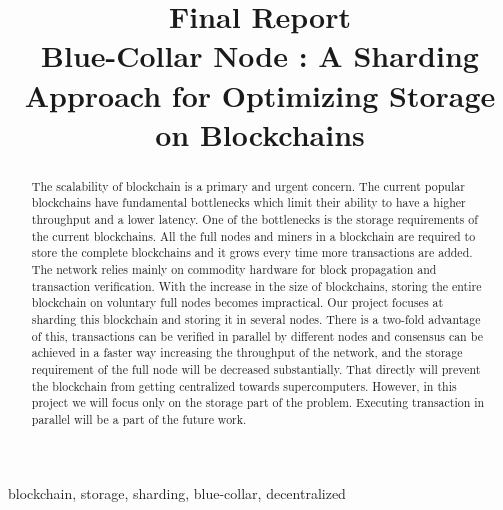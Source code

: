 \documentclass[conference]{IEEEtran}
\begin{document}
\WarningsOff*

\title{Final Report\\
Blue-Collar Node : A Sharding Approach for Optimizing Storage on Blockchains
}

\author{
\and
{}
}

\maketitle

\begin{abstract}
    The scalability of blockchain is a primary and urgent concern. The current
    popular blockchains have fundamental bottlenecks which limit their ability
    to have a higher throughput and a lower latency. One of the bottlenecks is
    the storage requirements of the current blockchains. All the full nodes and
    miners in a blockchain are required to store the complete blockchains and it
    grows every time more transactions are added. The network relies mainly on
    commodity hardware for block propagation and transaction verification.
    With the increase in the size of blockchains, storing the entire blockchain
    on voluntary full nodes becomes impractical. Our project focuses at sharding
    this blockchain and storing it in several nodes. There is a two-fold advantage of this,
    transactions can be verified in parallel by different nodes and consensus
    can be achieved in a faster way increasing the throughput of the network,
    and the storage requirement of the full node will be decreased
    substantially. That directly will prevent the blockchain from getting
    centralized towards supercomputers. However, in this project we will focus
    only on the storage part of the problem. Executing transaction in parallel
    will be a part of the future work.
\end{abstract}

\begin{IEEEkeywords}
    blockchain, storage, sharding, blue-collar, decentralized
\end{IEEEkeywords}
\end{document}
